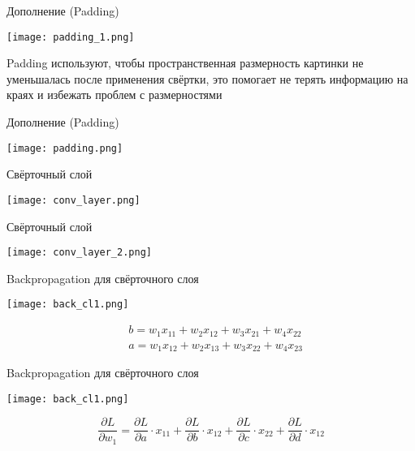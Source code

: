 \documentclass[notes,12pt, aspectratio=169]{beamer}
\begin{document}
\begin{frame}{Дополнение (Padding)}
\begin{center}
	\texttt{[image: padding\_1.png]}
\end{center}
\vfill
\alert{Padding} используют, чтобы пространственная размерность картинки не уменьшалась после применения свёртки, это помогает не терять информацию на краях и избежать проблем с размерностями
\end{frame}


\begin{frame}{Дополнение (Padding)}
\begin{center}
	\texttt{[image: padding.png]}
\end{center}
\end{frame}


\begin{frame}{Свёрточный слой}
\begin{center}
	\texttt{[image: conv\_layer.png]}
\end{center}
\end{frame}


\begin{frame}{Свёрточный слой}
\begin{center}
	\texttt{[image: conv\_layer\_2.png]}
\end{center}
\end{frame}


\begin{frame}{Backpropagation для свёрточного слоя}
\begin{center}
 \texttt{[image: back\_cl1.png]}
\end{center}


\begin{equation*}
\begin{aligned}
& b = w_1 x_{11} + w_2 x_{12} + w_3 x_{21} + w_4 x_{22} \\
& a = w_1 x_{12} + w_2 x_{13} + w_3 x_{22} + w_4 x_{23} 
\end{aligned}
\end{equation*}
\end{frame}


\begin{frame}{Backpropagation для свёрточного слоя}
\begin{center}
	\texttt{[image: back\_cl1.png]}
\end{center}

\[
\frac{\partial L}{\partial w_1} = \frac{ \partial L }{\partial a} \cdot x_{11} + \frac{ \partial L }{\partial b} \cdot x_{12} + \frac{ \partial L }{\partial c} \cdot x_{22}  + \frac{ \partial L }{\partial d} \cdot x_{12} 
\]
\end{frame}
\end{document}
